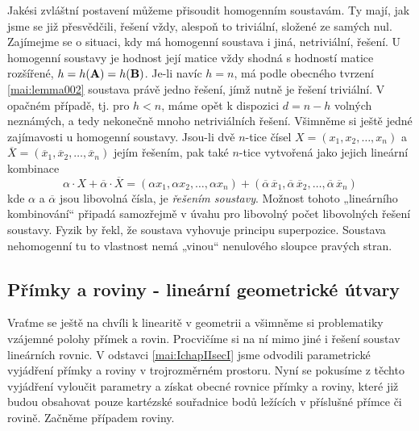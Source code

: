     Jakési zvláštní postavení můžeme přisoudit homogenním soustavám. Ty mají, jak jsme se
    již přesvědčili, řešení vždy, alespoň to triviální, složené ze samých nul. Zajímejme se o 
    situaci, kdy má homogenní soustava i jiná, netriviální, řešení. U homogenní soustavy je 
    hodnost její matice vždy shodná s hodností matice rozšířené, \(h = h(\mathbf{A}) = h(\mathbf{B})\). 
    Je-li navíc \(h = n\), má podle obecného tvrzení \ref{mai:lemma002} soustava právě jedno 
    řešení, jímž nutně je řešení triviální. V opačném případě, tj. pro \(h < n\), máme opět k 
    dispozici \(d = n - h\) volných neznámých, a tedy nekonečně mnoho netriviálních řešení. 
    Všimněme si ještě jedné zajímavosti u homogenní soustavy. Jsou-li dvě \(n\)-tice čísel \(X = 
    (x_1, x_2, \ldots, x_n)\) a \(\overline{X} = (\overline{x}_1, \overline{x}_2, \ldots, 
    \overline{x}_n)\) jejím řešením, pak také \(n\)-tice vytvořená jako jejich lineární kombinace
    \begin{equation*}
      \alpha\cdot X + \overline{\alpha}\cdot\overline{X} = 
        (\alpha x_1, \alpha x_2, \ldots, \alpha x_n) + 
        (\overline{\alpha}\,\overline{x}_1, 
        \overline{\alpha}\,\overline{x}_2, \ldots, 
        \overline{\alpha}\,\overline{x}_n)
    \end{equation*}
    kde \(\alpha\) a \(\overline{\alpha}\) jsou libovolná čísla, je \emph{řešením soustavy}. 
    Možnost tohoto „lineárního kombinování“ připadá samozřejmě v úvahu pro libovolný počet 
    libovolných řešení soustavy. Fyzik by řekl, že soustava vyhovuje principu superpozice. 
    Soustava nehomogenní tu to vlastnost nemá „vinou“ nenulového sloupce 
    pravých stran.
    
    \subsection{Přímky a roviny - lineární geometrické útvary}
      Vraťme se ještě na chvíli k linearitě v geometrii a všimněme si problematiky vzájemné polohy
      přímek a rovin. Procvičíme si na ní mimo jiné i řešení soustav lineárních rovnic. V odstavci 
      \ref{mai:IchapIIsecI} jsme odvodili parametrické vyjádření přímky a roviny v trojrozměrném 
      prostoru. Nyní se pokusíme z těchto vyjádření vyloučit parametry a získat obecné rovnice 
      přímky a roviny, které již budou obsahovat pouze kartézské souřadnice bodů ležících v 
      příslušné přímce či rovině. Začněme případem roviny.

      

